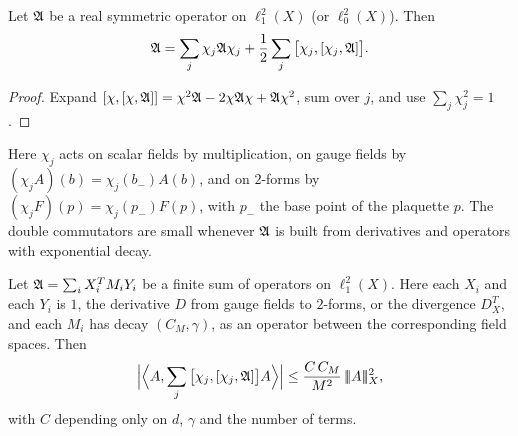 \begin{lemma}\label{lem:IMS}
Let $\mathfrak A$ be a real symmetric operator on $\ell^2_1(X)$ (or $\ell^2_0(X)$). Then
\[
\mathfrak A=\sum_j\chi_j\mathfrak A\chi_j+\frac12\sum_j\big[\chi_j,[\chi_j,\mathfrak A]\big].
\]
\end{lemma}

\begin{proof}
Expand $[\chi,[\chi,\mathfrak A]]=\chi^2\mathfrak A-2\chi\mathfrak A\chi+\mathfrak A\chi^2$, sum over $j$, and use $\sum_j\chi_j^2=1$.
\end{proof}

Here $\chi_j$ acts on scalar fields by multiplication, on gauge fields by $(\chi_jA)(b)=\chi_j(b_-)A(b)$, and on $2$-forms by $(\chi_jF)(p)=\chi_j(p_-)F(p)$, with $p_-$ the base point of the plaquette $p$. The double commutators are small whenever $\mathfrak A$ is built from derivatives and operators with exponential decay.

\begin{lemma}\label{lem:double-comm}
Let $\mathfrak A=\sum_iX_i^TM_iY_i$ be a finite sum of operators on $\ell^2_1(X)$. Here each $X_i$ and each $Y_i$ is $1$, the derivative $D$ from gauge fields to $2$-forms, or the divergence $D^T_X$, and each $M_i$ has decay $(C_M,\gamma)$, as an operator between the corresponding field spaces. Then
\[
\Big|\Big\langle A,\sum_j\big[\chi_j,[\chi_j,\mathfrak A]\big]A\Big\rangle\Big|\le\frac{C\,C_M}{M^2}\,|\!|\!|A|\!|\!|_X^2 ,
\]
with $C$ depending only on $d$, $\gamma$ and the number of terms.
\end{lemma}

